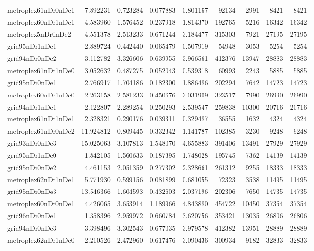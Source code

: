 \documentclass[../../../thesis.tex]{subfiles}
\begin{document}
\begin{longtable}{|l|r|r|r|r|r|r|r|r|}
metroplex61nDr0nDe1 & 7.892231 & 0.723284 & 0.077883 & 0.801167 & 92134 & 2991 & 8421 & 8421 \\
metroplex60nDr1nDe1 & 4.583960 & 1.576452 & 0.237918 & 1.814370 & 192765 & 5216 & 16342 & 16342 \\
metroplex5nDr0nDe2 & 4.551378 & 2.513233 & 0.671244 & 3.184477 & 315303 & 7921 & 27195 & 27195 \\
grid95nDr1nDe1 & 2.889724 & 0.442440 & 0.065479 & 0.507919 & 54948 & 3053 & 5254 & 5254 \\
grid94nDr0nDe2 & 3.112782 & 3.326606 & 0.639955 & 3.966561 & 412376 & 13947 & 28883 & 28883 \\
metroplex61nDr1nDe0 & 3.052632 & 0.487275 & 0.052043 & 0.539318 & 60993 & 2243 & 5885 & 5885 \\
grid95nDr0nDe1 & 2.766917 & 1.704186 & 0.182300 & 1.886486 & 202294 & 7642 & 14723 & 14723 \\
metroplex60nDr1nDe0 & 2.263158 & 2.581233 & 0.450676 & 3.031909 & 323517 & 7990 & 26990 & 26990 \\
grid94nDr1nDe1 & 2.122807 & 2.289254 & 0.250293 & 2.539547 & 259838 & 10300 & 20716 & 20716 \\
metroplex61nDr1nDe1 & 2.328321 & 0.290176 & 0.039311 & 0.329487 & 36555 & 1632 & 4324 & 4324 \\
metroplex61nDr0nDe2 & 11.924812 & 0.809445 & 0.332342 & 1.141787 & 102385 & 3230 & 9248 & 9248 \\
grid93nDr0nDe3 & 15.025063 & 3.107813 & 1.548070 & 4.655883 & 391406 & 13491 & 27929 & 27929 \\
grid95nDr1nDe0 & 1.842105 & 1.560633 & 0.187395 & 1.748028 & 195745 & 7362 & 14139 & 14139 \\
grid95nDr0nDe2 & 4.461153 & 2.051359 & 0.277302 & 2.328661 & 261312 & 9255 & 18333 & 18333 \\
metroplex62nDr1nDe1 & 5.771930 & 0.599156 & 0.081899 & 0.681055 & 72323 & 3538 & 11495 & 11495 \\
grid95nDr0nDe3 & 13.546366 & 1.604593 & 0.432603 & 2.037196 & 202306 & 7650 & 14735 & 14735 \\
metroplex60nDr0nDe1 & 4.426065 & 3.653914 & 1.189966 & 4.843880 & 454722 & 10450 & 37354 & 37354 \\
grid96nDr0nDe1 & 1.358396 & 2.959972 & 0.660784 & 3.620756 & 353421 & 13035 & 26806 & 26806 \\
grid94nDr0nDe3 & 3.398496 & 3.302543 & 0.677035 & 3.979578 & 412382 & 13951 & 28889 & 28889 \\
metroplex62nDr1nDe0 & 2.210526 & 2.472960 & 0.617476 & 3.090436 & 300934 & 9182 & 32833 & 32833 \\

\end{longtable}
\end{document}
